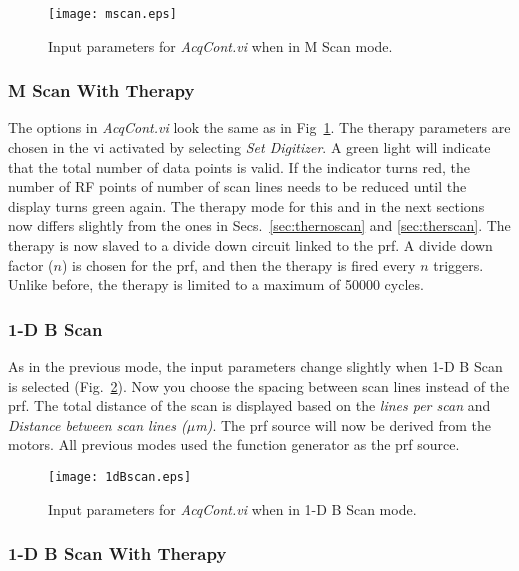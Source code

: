 \documentclass[10pt]{article}
\begin{document}
\begin{figure}[htb]
\begin{center}
\texttt{[image: mscan.eps]}
 \caption{Input parameters for {\it AcqCont.vi} when in M Scan mode.}
 \label{fig:mscan}
\end{center}
\end{figure}

\subsubsection{M Scan With Therapy}

The options in {\it AcqCont.vi} look the same as in
Fig~\ref{fig:mscan}. The therapy parameters are chosen in the vi
activated by selecting {\it Set Digitizer}. A green light will
indicate that the total number of data points is valid. If the
indicator turns red, the number of RF points of number of scan
lines needs to be reduced until the display turns green again. The
therapy mode for this and in the next sections now differs
slightly from the ones in Secs.~\ref{sec:thernoscan} and
\ref{sec:therscan}. The therapy is now slaved to a divide down
circuit linked to the prf. A divide down factor ($n$) is chosen
for the prf, and then the therapy is fired every $n$ triggers.
Unlike before, the therapy is limited to a maximum of 50000
cycles.

\subsubsection{1-D B Scan}

As in the previous mode, the input parameters change slightly when
1-D B Scan is selected (Fig.~\ref{fig:1dBscan}). Now you choose
the spacing between scan lines instead of the prf. The total
distance of the scan is displayed based on the {\it lines per
scan} and {\it Distance between scan lines ($\mu$m)}. The prf
source will now be derived from the motors. All previous modes
used the function generator as the prf source.


\begin{figure}[htb]
\begin{center}
\texttt{[image: 1dBscan.eps]}
 \caption{Input parameters for {\it AcqCont.vi} when in 1-D B Scan mode.}
 \label{fig:1dBscan}
\end{center}
\end{figure}


\subsubsection{1-D B Scan With Therapy}
\end{document}

